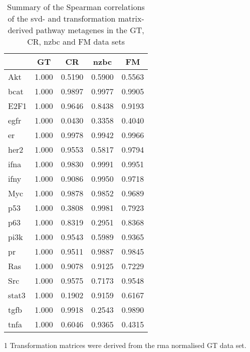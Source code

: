 \begin{table}[htpb]
	\centering
	\begin{threeparttable}
	\caption[Summary of the Spearman correlations of the \gls{svd}- and TM-derived pathway metagenes in the GT, CR, \gls{nzbc} and FM data sets]{Summary of the Spearman correlations of the \gls{svd}- and transformation matrix-derived pathway metagenes in the GT, CR, \gls{nzbc} and FM data sets}
	\label{tab:svd_vs_tm_path}
		\begin{tabular}{lcccc}
			& GT & CR & \gls{nzbc} & FM\\
			\hline
			\hline
			\rule{0pt}{2.25ex}Akt & 1.000 & 0.5190 & 0.5900 & 0.5563 \\
			\gls{bcat}            & 1.000 & 0.9897 & 0.9977 & 0.9905 \\
			E2F1                  & 1.000 & 0.9646 & 0.8438 & 0.9193 \\
			\gls{egfr}            & 1.000 & 0.0430 & 0.3358 & 0.4040 \\
			\gls{er}              & 1.000 & 0.9978 & 0.9942 & 0.9966 \\
			\gls{her2}            & 1.000 & 0.9553 & 0.5817 & 0.9794 \\
			\gls{ifna}            & 1.000 & 0.9830 & 0.9991 & 0.9951 \\
			\gls{ifny}            & 1.000 & 0.9086 & 0.9950 & 0.9718 \\
			Myc                   & 1.000 & 0.9878 & 0.9852 & 0.9689 \\
			p53                   & 1.000 & 0.3808 & 0.9981 & 0.7923 \\
			p63                   & 1.000 & 0.8319 & 0.2951 & 0.8368 \\
			\gls{pi3k}            & 1.000 & 0.9543 & 0.5989 & 0.9365 \\
			\gls{pr}              & 1.000 & 0.9511 & 0.9887 & 0.9845 \\
			Ras                   & 1.000 & 0.9078 & 0.9125 & 0.7229 \\
			Src                   & 1.000 & 0.9575 & 0.7173 & 0.9548 \\
			\gls{stat3}           & 1.000 & 0.1902 & 0.9159 & 0.6167 \\
			\gls{tgfb}            & 1.000 & 0.9918 & 0.2543 & 0.9890 \\
			\gls{tnfa}            & 1.000 & 0.6046 & 0.9365 & 0.4315 \\
			\hline
			\hline
		\end{tabular}
		\begin{tablenotes}
			\begin{footnotesize}
				\item [1] Transformation matrices were derived from the \gls{rma} normalised GT data set.
			\end{footnotesize}
		\end{tablenotes}
	\end{threeparttable}
\end{table}

